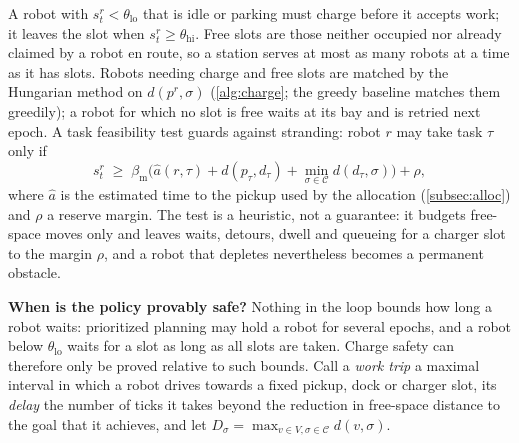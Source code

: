 A robot with $s^r_t<\theta_{\mathrm{lo}}$ that is idle or parking must charge
before it accepts work; it leaves the slot when
$s^r_t\ge\theta_{\mathrm{hi}}$. Free slots are those neither occupied nor
already claimed by a robot en route, so a station serves at most as many
robots at a time as it has slots. Robots needing charge and free slots are matched
by the Hungarian method on $d(p^r,\sigma)$ (\cref{alg:charge}; the greedy baseline matches them greedily); a robot for
which no slot is free waits at its bay and is retried next epoch. A task
feasibility test guards against stranding: robot $r$ may take task $\tau$
only if
\begin{equation}\label{eq:feasible}
  s^r_t \;\ge\; \beta_{\mathrm{m}}\bigl(\hat a(r,\tau) + d(p_\tau,d_\tau) + \min_{\sigma\in\mathcal{C}} d(d_\tau,\sigma)\bigr) + \rho,
\end{equation}
where $\hat a$ is the estimated time to the pickup used by the allocation
(\cref{subsec:alloc}) and $\rho$ a reserve margin. The test is a heuristic,
not a guarantee: it budgets free-space moves only and leaves waits, detours,
dwell and queueing for a charger slot to the margin $\rho$, and a robot that
depletes nevertheless becomes a permanent obstacle.

\noindent\textbf{When is the policy provably safe?}
Nothing in the loop bounds how long a robot waits: prioritized planning may
hold a robot for several epochs, and a robot below $\theta_{\mathrm{lo}}$
waits for a slot as long as all slots are taken. Charge safety can therefore
only be proved relative to such bounds. Call a \emph{work trip} a maximal
interval in which a robot drives towards a fixed pickup, dock or charger
slot, its \emph{delay} the number of ticks it takes beyond the reduction in
free-space distance to the goal that it achieves, and let
$D_\sigma=\max_{v\in V,\sigma\in\mathcal{C}}d(v,\sigma)$.

